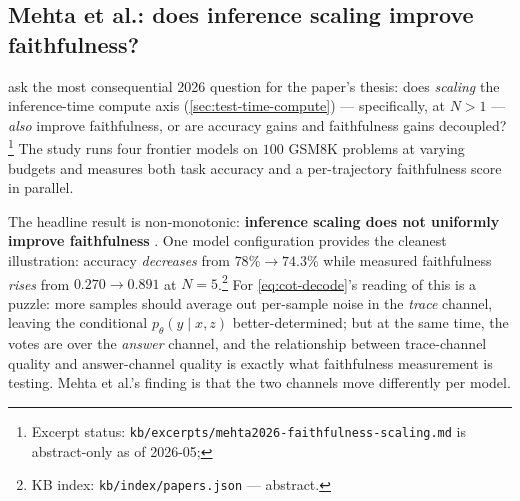 \subsection{Mehta et al.: does inference scaling improve faithfulness?}
\label{sec:faith-mehta}

\citet{mehta2026-faithfulness-scaling} ask the most consequential 2026
question for the paper's thesis: does \emph{scaling} the inference-time
compute axis (\cref{sec:test-time-compute}) — specifically,
 at $N > 1$ — \emph{also} improve faithfulness, or are
accuracy gains and faithfulness gains decoupled?%
\footnote{Excerpt status:
\nolinkurl{kb/excerpts/mehta2026-faithfulness-scaling.md} is abstract-only
as of 2026-05; } The study runs four frontier models
 on $100$ GSM8K problems at varying 
budgets and measures both task accuracy and a per-trajectory
faithfulness score in parallel.

The headline result is non-monotonic: \textbf{inference scaling does
not uniformly improve faithfulness}
\citep[abstract]{mehta2026-faithfulness-scaling}. One model
configuration provides the cleanest illustration: accuracy
\emph{decreases} from $78\% \to 74.3\%$ while measured faithfulness
\emph{rises} from $0.270 \to 0.891$ at
$N = 5$.\footnote{KB index:
\texttt{kb/index/papers.json} — abstract.
}
For \cref{eq:cot-decode}'s reading of  this is a
puzzle: more samples should average out per-sample noise in the
\emph{trace} channel, leaving the conditional $p_\theta(y \mid x, z)$
better-determined; but at the same time, the votes are over the
\emph{answer} channel, and the relationship between trace-channel
quality and answer-channel quality is exactly what faithfulness
measurement is testing. Mehta et al.'s finding is that the two channels
move differently per model.

